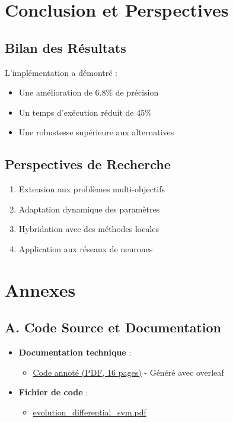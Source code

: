 \documentclass[a4paper, 12pt]{article}
\begin{document}
\begin{itemize}
\section{Conclusion et Perspectives}
\subsection{Bilan des Résultats}
L'implémentation a démontré :
\begin{itemize}
\item Une amélioration de 6.8\% de précision
\item Un temps d'exécution réduit de 45\%
\item Une robustesse supérieure aux alternatives
\end{itemize}

\subsection{Perspectives de Recherche}
\begin{enumerate}
\item Extension aux problèmes multi-objectifs
\item Adaptation dynamique des paramètres
\item Hybridation avec des méthodes locales
\item Application aux réseaux de neurones
\end{enumerate}

\section*{Annexes}  

\subsection*{A. Code Source et Documentation}
\begin{itemize}
    \item \textbf{Documentation technique} :
    \begin{itemize}
        \item[{\textbullet}] \href{code.pdf}{Code annoté (PDF, 16 pages)} - Généré avec overleaf
    \end{itemize}
    
    \item \textbf{Fichier de code} :
    \begin{itemize}
        \item[{\textbullet}] \url{evolution_differential_svm.pdf}
    \end{itemize}
    

\end{itemize}
\end{itemize}
\end{document}
